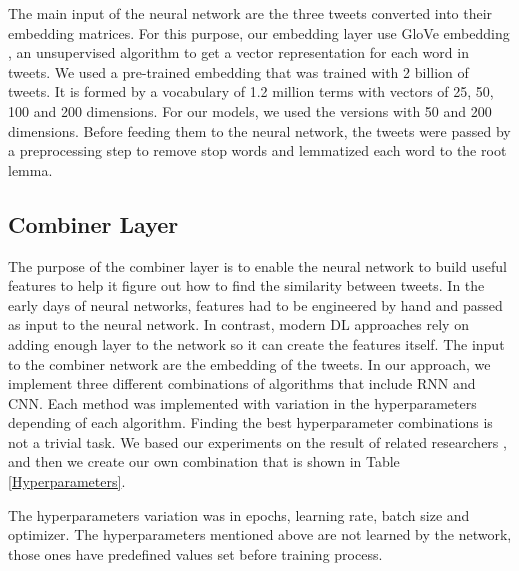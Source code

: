 \documentclass[12pt]{report}
\begin{document}

The main input of the neural network are the three tweets converted into their embedding matrices. For this purpose, our embedding layer use GloVe embedding \cite{Pennington2014}, an unsupervised algorithm to get a vector representation for each word in tweets. We used a pre-trained embedding that was trained with 2 billion of tweets. It is formed by a vocabulary of 1.2 million  terms with vectors of 25, 50, 100 and 200 dimensions. For our  models, we used the versions 
with 50 and 200 dimensions. Before feeding them to the neural network, the tweets were passed by a preprocessing step to remove stop words and lemmatized each word to the root lemma.



\subsection{Combiner Layer \label{combiner_layer}}
The purpose of the combiner layer is to enable the neural network to build useful features to help it figure out how to find the similarity between tweets. 
In the early days of neural networks, features had to be engineered by hand and passed as input to the neural network. In contrast, modern DL approaches
rely on adding enough layer to the network so it can create the features itself. The input to the combiner network are the embedding of the tweets.
In our approach,  we implement three different combinations of algorithms that include RNN and CNN.  Each method was implemented with variation in the hyperparameters depending of each algorithm.
Finding the best hyperparameter combinations is not a trivial task. We based our experiments on the result of related researchers \cite{8622504}, and then we create our own combination that is shown in Table \ref{Hyperparameters}.

The hyperparameters variation was in epochs, learning rate, batch size and optimizer. The hyperparameters mentioned above are not learned by the network, those ones have predefined values set before training process.
\end{document}
